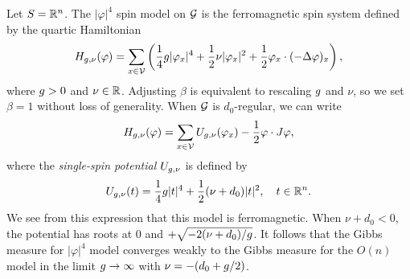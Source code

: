 \begin{example}
Let $S = {\mathbb R}^n$. The $|\varphi|^4$ spin model on $\mathcal{G}$ is the ferromagnetic spin system
defined by the quartic Hamiltonian
\begin{equation}
\label{e:phi4-Ham}
H_{g,\nu}(\varphi)
  =
\sum_{x\in\mathcal{V}}
\left(
  \frac{1}{4} g |\varphi_x|^4
    +
  \frac{1}{2} \nu |\varphi_x|^2
    +
  \frac{1}{2} \varphi_x \cdot (-\Delta \varphi)_x
\right),
\end{equation}
where $g > 0$ and $\nu\in{\mathbb R}$. Adjusting $\beta$ is equivalent to  rescaling
$g$ and $\nu$, so we set $\beta = 1$ without loss of generality.
When $\mathcal{G}$ is $d_0$-regular, we can write
\begin{equation}
H_{g,\nu}(\varphi)
  =
\sum_{x\in\mathcal{V}} U_{g,\nu}(\varphi_x) - \frac{1}{2} \varphi \cdot J \varphi,
\end{equation}
where the \emph{single-spin potential} $U_{g,\nu}$ is defined by
\begin{equation}
U_{g,\nu}(t)
	=
\frac{1}{4} g |t|^4
	+
\frac{1}{2} (\nu + d_0) |t|^2,
	\quad
t \in {\mathbb R}^n.
\end{equation}
We see from this expression that this model is ferromagnetic.
When $\nu + d_0 < 0$, the potential has roots at $0$ and $+\sqrt{-2 (\nu + d_0) / g}$.
It follows that the Gibbs measure for $|\varphi|^4$ model converges weakly to the
Gibbs measure for the $O(n)$ model in the limit $g\rightarrow\infty$
with $\nu = -(d_0 + g / 2)$.
\end{example}



